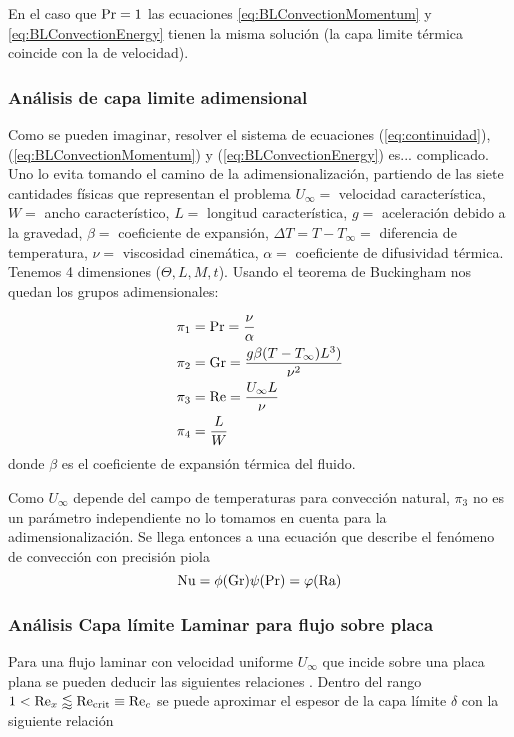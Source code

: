 En el caso que $\textrm{Pr}=1$ las ecuaciones \ref{eq:BLConvectionMomentum} y \ref{eq:BLConvectionEnergy} tienen la misma solución (la capa limite térmica coincide con la de velocidad). 



\subsubsection{Análisis de capa limite adimensional} \label{section:BLdimensionlessAnalisis}
Como se pueden imaginar, resolver el sistema de ecuaciones (\ref{eq:continuidad}), (\ref{eq:BLConvectionMomentum}) y (\ref{eq:BLConvectionEnergy}) es... complicado. Uno lo evita tomando el camino de la adimensionalización, partiendo de las siete cantidades físicas que representan el problema $U_\infty=$ velocidad característica,$W=$ ancho característico, $L=$ longitud característica, $g=$ aceleración debido a la gravedad, $\beta=$ coeficiente de expansión, $\Delta T=T-T_\infty=$ diferencia de temperatura, $\nu=$ viscosidad cinemática, $\alpha=$ coeficiente de difusividad térmica. Tenemos 4 dimensiones ($\Theta, L, M, t$). Usando el teorema de Buckingham nos quedan los grupos adimensionales:

\begin{align*}
    \pi_1&=\textrm{Pr}=\frac{\nu}{\alpha}\\
    \pi_2&=\textrm{Gr}=\frac{g\beta (T-T_\infty)L^3)}{\nu^2}\\
    \pi_3&=\textrm{Re}=\frac{U_\infty L}{\nu} \\
    \pi_4&=\frac{L}{W}
\end{align*}
donde $\beta$ es el coeficiente de expansión térmica del fluido.

Como $U_\infty$ depende del campo de temperaturas para convección natural, $\pi_3$ no es un parámetro independiente no lo tomamos en cuenta para la adimensionalización. Se llega entonces a una ecuación que describe el fenómeno de convección con precisión piola
\begin{equation}\label{eq:DimensionlessNusselt}
    \textrm{Nu}=\phi(\textrm{Gr})\psi(\textrm{Pr})=\varphi(\textrm{Ra})
\end{equation}

\subsubsection{Análisis Capa límite Laminar para flujo sobre placa}
Para una flujo laminar con velocidad uniforme $U_\infty$ que incide sobre una placa plana se pueden deducir las siguientes relaciones \citep{kreith2011principles}. Dentro del rango $\num{1}<\textrm{Re}_x\lessapprox\textrm{Re}_{\mathrm{crit}}\equiv\textrm{Re}_c$ se puede aproximar el espesor de la capa límite $\delta$ con la siguiente relación

